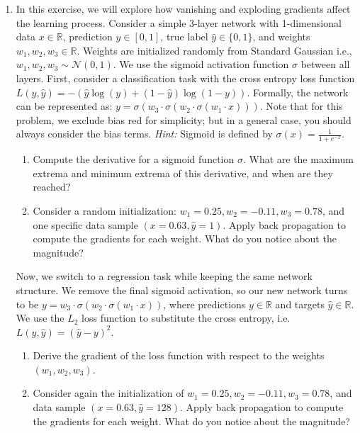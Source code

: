 \documentclass[a4paper]{article}
\begin{document}
\begin{enumerate}
	\item In this exercise, we will explore how vanishing and exploding gradients affect the learning process. Consider a simple 3-layer network with 1-dimensional data $x \in \mathbb{R}$, prediction $y \in [0, 1]$, true label $\hat{y} \in \{0, 1\}$, and weights $w_1, w_2, w_3 \in \mathbb{R}$.
    Weights are initialized randomly from Standard Gaussian i.e., $w_1, w_2, w_3\sim \mathcal{N}(0, 1)$. 
    We use the sigmoid activation function $\sigma$ between all layers.
    First, consider a classification task with the cross entropy loss function $L(y, \hat{y}) = -(\hat{y} \log(y) + (1-\hat{y}) \log(1-y))$. 
    Formally, the network can be represented as: $y = \sigma(w_3 \cdot \sigma(w_2 \cdot \sigma(w_1 \cdot x)))$. 
    Note that for this problem, we exclude bias red for simplicity; but in a general case, you should always consider the bias terms. \textit{Hint:} Sigmoid is defined by $\sigma(x)= \frac{1}{1 + e^{-x}}$.
	\begin{enumerate}
		\item Compute the derivative for a sigmoid function $\sigma$. What are the maximum extrema and minimum extrema of this derivative, and when are they reached? 
		\item Consider a random initialization: $w_1 = 0.25, w_2 = -0.11, w_3 = 0.78$, and one specific data sample $(x = 0.63, \hat{y} = 1)$. Apply back propagation to compute the gradients for each weight. What do you notice about the magnitude?
	\end{enumerate}
	
	Now, we switch to a regression task while keeping the same network structure. We remove the final sigmoid activation, so our new network turns to be $y = w_3 \cdot \sigma(w_2 \cdot \sigma(w_1 \cdot x))$, where predictions $y \in \mathbb{R}$ and targets $\hat{y} \in \mathbb{R}$. 
    We use the $L_2$ loss function to substitute the cross entropy, i.e. $L(y, \hat{y}) = (\hat{y}-y)^2$. 
	
	\begin{enumerate}[resume]
		\item Derive the gradient of the loss function with respect to the weights $(w_1, w_2, w_3)$.
		\item Consider again the initialization of $w_1 = 0.25, w_2 = -0.11, w_3 = 0.78$, and data sample $(x = 0.63, \hat{y} = 128)$. Apply back propagation to compute the gradients for each weight. What do you notice about the magnitude?
	\end{enumerate}
	
	
	
\end{enumerate}
	
	
\end{document}
